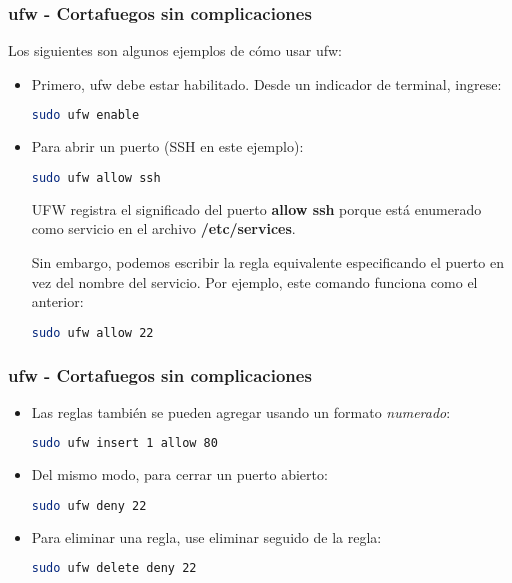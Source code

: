 \begin{frame}[fragile]
  \frametitle{ufw - Cortafuegos sin complicaciones}
  Los siguientes son algunos ejemplos de cómo usar ufw:
  \begin{itemize}
    \item Primero, ufw debe estar habilitado. Desde un indicador de terminal,
      ingrese:
      \begin{lstlisting}[language=Bash,numbers=none]
sudo ufw enable
      \end{lstlisting}
    \item Para abrir un puerto (SSH en este ejemplo):
      \begin{lstlisting}[language=Bash,numbers=none]
sudo ufw allow ssh
      \end{lstlisting}
      UFW registra el significado del puerto \textbf{allow ssh} porque está
      enumerado como servicio en el archivo \textbf{/etc/services}.

      Sin embargo, podemos escribir la regla equivalente especificando el
      puerto en vez del nombre del servicio. Por ejemplo, este comando
      funciona como el anterior:
      \begin{lstlisting}[language=Bash,numbers=none]
sudo ufw allow 22
      \end{lstlisting}
  \end{itemize}
\end{frame}

\begin{frame}[fragile]
  \frametitle{ufw - Cortafuegos sin complicaciones}
  \begin{itemize}
    \item Las reglas también se pueden agregar usando un formato
      \emph{numerado}:
      \begin{lstlisting}[language=Bash,numbers=none]
sudo ufw insert 1 allow 80
      \end{lstlisting}
    \item Del mismo modo, para cerrar un puerto abierto:
      \begin{lstlisting}[language=Bash,numbers=none]
sudo ufw deny 22
      \end{lstlisting}
    \item Para eliminar una regla, use eliminar seguido de la regla:
      \begin{lstlisting}[language=Bash,numbers=none]
sudo ufw delete deny 22
      \end{lstlisting}
  \end{itemize}
\end{frame}

